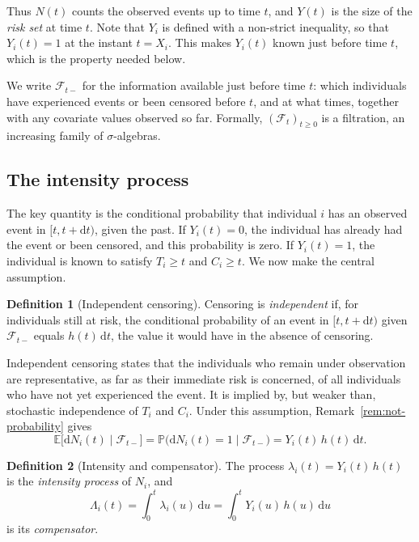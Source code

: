 \documentclass[11pt]{article}
\theoremstyle{definition}
\newtheorem{definition}{Definition}[section]
\theoremstyle{plain}
\newcommand{\Prob}{\mathbb{P}}
\newcommand{\E}{\mathbb{E}}
\newcommand{\dd}{\,\mathrm{d}}
\begin{document}
Thus $N(t)$ counts the observed events up to time $t$, and $Y(t)$ is the size of the \emph{risk set} at time $t$. Note that $Y_i$ is defined with a non-strict inequality, so that $Y_i(t) = 1$ at the instant $t = X_i$. This makes $Y_i(t)$ known just before time $t$, which is the property needed below.

We write $\mathcal{F}_{t-}$ for the information available just before time $t$: which individuals have experienced events or been censored before $t$, and at what times, together with any covariate values observed so far. Formally, $(\mathcal{F}_t)_{t \ge 0}$ is a filtration, an increasing family of $\sigma$-algebras.

\subsection{The intensity process}

The key quantity is the conditional probability that individual $i$ has an observed event in $[t, t + \mathrm{d}t)$, given the past. If $Y_i(t) = 0$, the individual has already had the event or been censored, and this probability is zero. If $Y_i(t) = 1$, the individual is known to satisfy $T_i \ge t$ and $C_i \ge t$. We now make the central assumption.

\begin{definition}[Independent censoring]
Censoring is \emph{independent} if, for individuals still at risk, the conditional probability of an event in $[t, t + \mathrm{d}t)$ given $\mathcal{F}_{t-}$ equals $h(t)\,\mathrm{d}t$, the value it would have in the absence of censoring.
\end{definition}

Independent censoring states that the individuals who remain under observation are representative, as far as their immediate risk is concerned, of all individuals who have not yet experienced the event. It is implied by, but weaker than, stochastic independence of $T_i$ and $C_i$. Under this assumption, Remark~\ref{rem:not-probability} gives
\begin{equation}\label{eq:intensity}
  \E\bigl[\mathrm{d}N_i(t) \mid \mathcal{F}_{t-}\bigr]
  = \Prob\bigl(\mathrm{d}N_i(t) = 1 \mid \mathcal{F}_{t-}\bigr)
  = Y_i(t)\,h(t)\,\mathrm{d}t.
\end{equation}

\begin{definition}[Intensity and compensator]
The process $\lambda_i(t) = Y_i(t)\,h(t)$ is the \emph{intensity process} of $N_i$, and
\[
  \Lambda_i(t) = \int_0^t \lambda_i(u) \dd u = \int_0^t Y_i(u)\,h(u) \dd u
\]
is its \emph{compensator}.
\end{definition}
\end{document}

